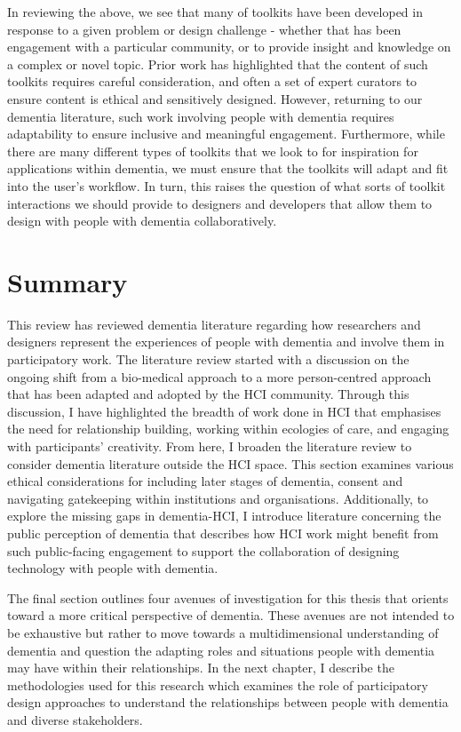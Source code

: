 In reviewing the above, we see that many of toolkits have been developed in response to a given problem or design challenge - whether that has been engagement with a particular community, or to provide insight and knowledge on a complex or novel topic. Prior work has highlighted that the content of such toolkits requires careful consideration, and often a set of expert curators to ensure content is ethical and sensitively designed. However, returning to our dementia literature, such work involving people with dementia requires adaptability to ensure inclusive and meaningful engagement. Furthermore, while there are many different types of toolkits that we look to for inspiration for applications within dementia, we must ensure that the toolkits will adapt and fit into the user’s workflow. In turn, this raises the question of what sorts of toolkit interactions we should provide to designers and developers that allow them to design with people with dementia collaboratively.

\section{Summary}
\label{BL:summary}
This review has reviewed dementia literature regarding how researchers and designers represent the experiences of people with dementia and involve them in participatory work. The literature review started with a discussion on the ongoing shift from a bio-medical approach to a more person-centred approach that has been adapted and adopted by the HCI community. Through this discussion, I have highlighted the breadth of work done in HCI that emphasises the need for relationship building, working within ecologies of care, and engaging with participants' creativity. From here, I broaden the literature review to consider dementia literature outside the HCI space. This section examines various ethical considerations for including later stages of dementia, consent and navigating gatekeeping within institutions and organisations. Additionally, to explore the missing gaps in dementia-HCI, I introduce literature concerning the public perception of dementia that describes how HCI work might benefit from such public-facing engagement to support the collaboration of designing technology with people with dementia.

The final section outlines four avenues of investigation for this thesis that orients toward a more critical perspective of dementia. These avenues are not intended to be exhaustive but rather to move towards a multidimensional understanding of dementia and question the adapting roles and situations people with dementia may have within their relationships. In the next chapter, I describe the methodologies used for this research which examines the role of participatory design approaches to understand the relationships between people with dementia and diverse stakeholders.
